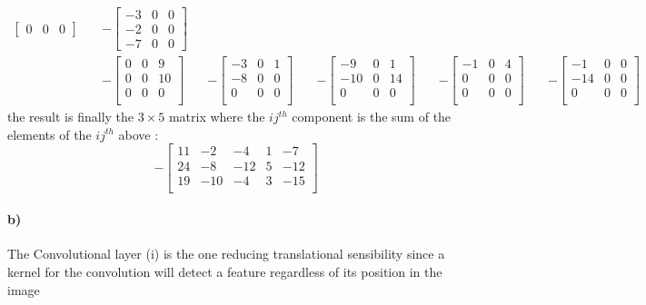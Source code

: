 \documentclass{article}
\begin{document}
\[\begin{aligned}
\begin{bmatrix}
				 0 & 0 & 0
			\end{bmatrix}
			\quad
			&-\begin{bmatrix}
				-3 & 0 & 0\\
				-2 & 0 & 0\\
				-7 & 0 & 0
			\end{bmatrix}
		\\
			&-\begin{bmatrix}
				0 & 0 & 9 \\
				0 & 0 & 10 \\
				0 & 0 & 0 \\
			\end{bmatrix}
			\quad
			&-\begin{bmatrix}
				-3 & 0 & 1 \\
				-8 & 0 & 0 \\
				 0 & 0 & 0 \\
			\end{bmatrix}
			\quad
			&-\begin{bmatrix}
				 -9 & 0 & 1 \\
				-10 & 0 & 14 \\
				  0 & 0 & 0 \\
			\end{bmatrix}
			\quad
			&-\begin{bmatrix}
				-1 & 0 & 4 \\
				 0 & 0 & 0 \\
				 0 & 0 & 0 \\
			\end{bmatrix}
			\quad
			&-\begin{bmatrix}
				 -1 & 0 & 0 \\
				-14 & 0 & 0 \\
				  0 & 0 & 0 \\
			\end{bmatrix}
		\end{aligned}
		\]
		the result is finally the $3 \times 5$ matrix where the $ij^{th}$ component is the sum of the elements of the $ij^{th}$ above :
		\[
		-\begin{bmatrix}
			11 & -2 & -4 & 1 & -7 \\
			24 & -8 & -12 & 5 & -12 \\
			19 & -10 & -4 & 3 & -15 \\
		\end{bmatrix}
		\]
		
	
		\paragraph{b)} 
		The Convolutional  layer (i) is the one reducing translational sensibility since a kernel for the convolution will detect a feature regardless of its position in the image
		
\end{document}
